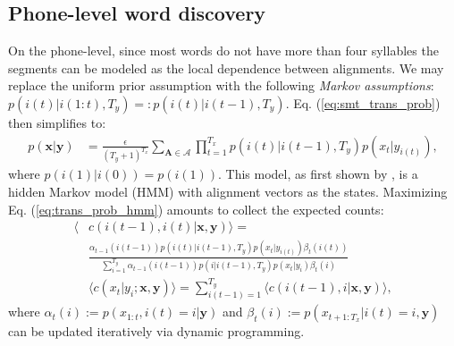 \documentclass[journal]{IEEEtran}
\begin{document}

\subsection{Phone-level word discovery}
On the phone-level, since most words do not have more than four syllables the segments can be modeled as the local dependence between alignments. We may replace the uniform prior assumption with the following \textit{Markov assumptions}: $p(i(t)|i(1:t), T_y) =: p(i(t)|i(t-1), T_y)$. Eq. (\ref{eq:smt_trans_prob}) then simplifies to:
\begin{align}\label{eq:trans_prob_hmm}
    p(\mathbf x|\mathbf y) &= \frac{\epsilon}{(T_y+1)^{T_x}}\sum_{\mathbf A \in \mathcal A}\prod_{t=1}^{T_x} p(i(t)|i(t-1), T_y) p(x_{t}|y_{i(t)}),
\end{align}
where $p(i(1)|i(0)) = p(i(1))$. This model, as first shown by \cite{Vogel1996, Och2003}, is a hidden Markov model (HMM) with alignment vectors as the states. Maximizing Eq. (\ref{eq:trans_prob_hmm}) amounts to collect the expected counts:
\begin{align}\label{eq:expected_counts_dhmm}
\langle &c(i(t-1), i(t)|\mathbf x, \mathbf y)\rangle
= \nonumber\\
&\frac{\alpha_{t-1}(i(t-1))p(i(t)|i(t-1), T_y)p(x_t|y_{i(t)})\beta_{t}(i(t))}{\sum_{i=1}^{T_y}\alpha_{t-1}(i(t-1))p(i|i(t-1), T_y)p(x_t|y_{i})\beta_t(i)}\\
&\langle c(x_t|y_i; \mathbf x, \mathbf y)\rangle
= \sum_{i(t-1)=1}^{T_y}\langle c(i(t-1), i| \mathbf x, \mathbf y)\rangle,
\end{align}
where $\alpha_t(i) := p(x_{1:t}, i(t)=i|\mathbf y)$ and $\beta_t(i) := p(x_{t+1:T_x}|i(t)=i, \mathbf y)$ can be updated iteratively via dynamic programming.
\end{document}
